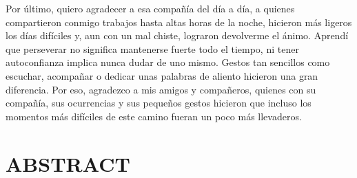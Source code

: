 \documentclass[12pt,letterpaper,oneside]{article}
\begin{document}
Por último, quiero agradecer a esa compañía del día a día, a quienes compartieron conmigo trabajos hasta altas horas de la noche, hicieron más ligeros los días difíciles y, aun con un mal chiste, lograron devolverme el ánimo. Aprendí que perseverar no significa mantenerse fuerte todo el tiempo, ni tener autoconfianza implica nunca dudar de uno mismo. Gestos tan sencillos como escuchar, acompañar o dedicar unas palabras de aliento hicieron una gran diferencia. Por eso, agradezco a mis amigos y compañeros, quienes con su compañía, sus ocurrencias y sus pequeños gestos hicieron que incluso los momentos más difíciles de este camino fueran un poco más llevaderos.

\clearpage

\tableofcontents

\clearpage
\section*{ABSTRACT}
\end{document}
